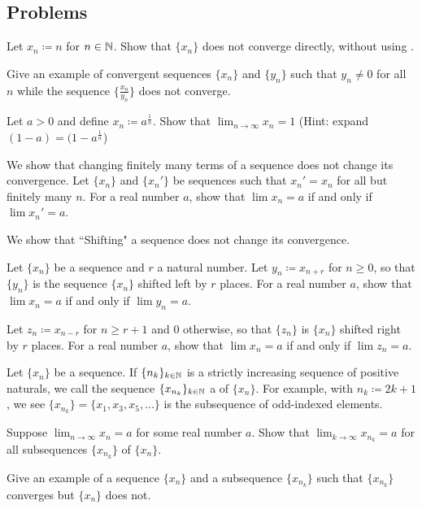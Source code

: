\documentclass[../notes.tex]{subfiles}
\begin{document}
\subsection{Problems}
\begin{homework}
    Let $x_n\coloneqq n$ for $n\in \mathbb N$. Show that $\{x_n\}$ does not converge directly, without using . 
\end{homework}
\begin{homework}
    Give an example of convergent sequences $\{x_n\}$ and $\{y_n\}$ such that $y_n\neq 0$ for all $n$ while the sequence $\big\{ \frac{x_n}{y_n} \big\}$ does not converge.
\end{homework}
\begin{homework}
    Let $a>0$ and define $x_n\coloneqq a^\frac{1}{n}$. Show that $\lim_{n\to \infty}x_n = 1$ (Hint: expand $(1-a)=(1-a^{\frac{1}{n}}$)%
\end{homework}
\begin{homework}
    We show that changing finitely many terms of a sequence does not change its convergence. Let $\{x_n\}$ and $\{x_n'\}$ be sequences such that $x_n' = x_n$ for all but finitely many $n$. For a real number $a$, show that $\lim x_n = a$ if and only if $\lim x_n'=a$.
\end{homework}
\begin{homework}
    We show that ``Shifting" a sequence does not change its convergence.
    \begin{listalph}
        \item Let $\{x_n\}$ be a sequence and $r$ a natural number. Let $y_n \coloneqq x_{n+r}$ for $n\geq 0$, so that $\{y_n\}$ is the sequence $\{x_n\}$ shifted left by $r$ places. For a real number $a$, show that $\lim x_n=a$ if and only if $\lim y_n=a$.
        \item  Let $z_n\coloneqq x_{n-r}$ for $n\geq r+1$ and $0$ otherwise, so that $\{z_n\}$ is $\{x_n\}$ shifted right by $r$ places. For a real number $a$, show that $\lim x_n=a$ if and only if $\lim z_n=a$.
    \end{listalph}
\end{homework}
\begin{homework}
    Let $\{x_n\}$ be a sequence. If $\{n_k\}_{k\in\mathbb N}$ is a strictly increasing sequence of positive naturals, we call the sequence $\{x_{n_k}\}_{k\in \mathbb N}$ a  of $\{x_n\}$. For example, with $n_k \coloneqq 2k+1$, we see $\{x_{n_k}\}=\{x_1, x_3, x_5, \dots\}$ is the subsequence of odd-indexed elements. 
    \begin{listalph}
        \item Suppose $\lim_{n\to \infty} x_n =a$ for some real number $a$. Show that $\lim_{k\to\infty}x_{n_k}=a$ for all subsequences $\{x_{n_k}\}$ of $\{x_n\}$. 
        \item Give an example of a sequence $\{x_n\}$ and a subsequence $\{x_{n_k}\}$ such that $\{x_{n_k}\}$ converges but $\{x_n\}$ does not.
    \end{listalph}
\end{homework}
\end{document}

